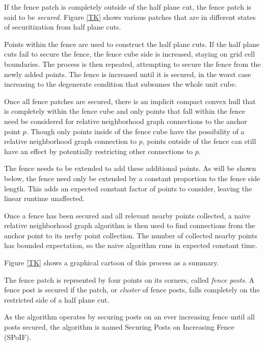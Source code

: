 \documentclass[a4paper,fleqn]{cas-dc}
\begin{document}
If the fence patch is completely outside of the half plane cut, the fence patch is said
to be \emph{secured}.
Figure \ref{TK} shows various patches that are in different states of securitization
from half plane cuts.

Points within the fence are used to construct the half plane cuts.
If the half plane cuts fail to secure the fence, the fence cube side is increased,
staying on grid cell boundaries.
The process is then repeated, attempting to secure the fence from the newly added points.
The fence is increased until it is secured, in the worst case increasing to the
degenerate condition that subsumes the whole unit cube.

Once all fence patches are secured, there is an implicit compact convex hull that is completely
within the fence cube and only points that fall within the fence need be considered
for relative neighborhood graph connections to the anchor point $p$.
Though only points inside of the fence cube have the possibility of a relative neighborhood
graph connection to $p$, points outside of the fence can still have an effect
by potentially restricting other connections to $p$.

The fence needs to be extended to add these additional points. As will be shown below,
the fence need only be extended by a constant proportion to the fence side length.
This adds an expected constant factor of points to consider, leaving the linear runtime
unaffected.

Once a fence has been secured and all relevant nearby points collected, a naive
relative neighborhood graph algorithm is then used to find connections from the anchor
point to its nerby  point collection.
The number of collected nearby points has bounded expectation, so the naive algorithm runs
in expected constant time.

Figure \ref{TK} shows a graphical cartoon of this process as a summary.

The fence patch is reprsented by four points on its corners, called \emph{ fence posts}.
A fence post is secured if the patch, or \emph{cluster} of fence posts, falls
completely on the restricted side of a half plane cut.

As the algorithm operates by securing posts on an ever increasing fence until all
posts secured, the algorithm is named Securing Posts on Increasing Fence (SPoIF).

\end{document}
